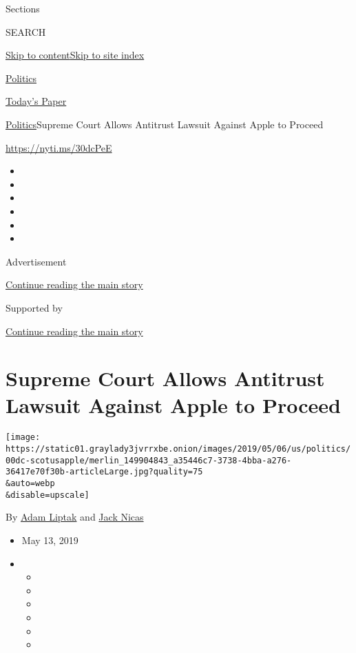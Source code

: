 Sections

SEARCH

\protect\hyperlink{site-content}{Skip to
content}\protect\hyperlink{site-index}{Skip to site index}

\href{https://www.nytimes3xbfgragh.onion/section/politics}{Politics}

\href{https://myaccount.nytimes3xbfgragh.onion/auth/login?response_type=cookie\&client_id=vi}{}

\href{https://www.nytimes3xbfgragh.onion/section/todayspaper}{Today's
Paper}

\href{/section/politics}{Politics}\textbar{}Supreme Court Allows
Antitrust Lawsuit Against Apple to Proceed

\url{https://nyti.ms/30dcPeE}

\begin{itemize}
\item
\item
\item
\item
\item
\item
\end{itemize}

Advertisement

\protect\hyperlink{after-top}{Continue reading the main story}

Supported by

\protect\hyperlink{after-sponsor}{Continue reading the main story}

\hypertarget{supreme-court-allows-antitrust-lawsuit-against-apple-to-proceed}{%
\section{Supreme Court Allows Antitrust Lawsuit Against Apple to
Proceed}\label{supreme-court-allows-antitrust-lawsuit-against-apple-to-proceed}}

\texttt{[image: https://static01.graylady3jvrrxbe.onion/images/2019/05/06/us/politics/00dc-scotusapple/merlin\_149904843\_a35446c7-3738-4bba-a276-36417e70f30b-articleLarge.jpg?quality=75\\\&auto=webp\\\&disable=upscale]}

By \href{https://www.nytimes3xbfgragh.onion/by/adam-liptak}{Adam Liptak}
and \href{https://www.nytimes3xbfgragh.onion/by/jack-nicas}{Jack Nicas}

\begin{itemize}
\item
  May 13, 2019
\item
  \begin{itemize}
  \item
  \item
  \item
  \item
  \item
  \item
  \end{itemize}
\end{itemize}

